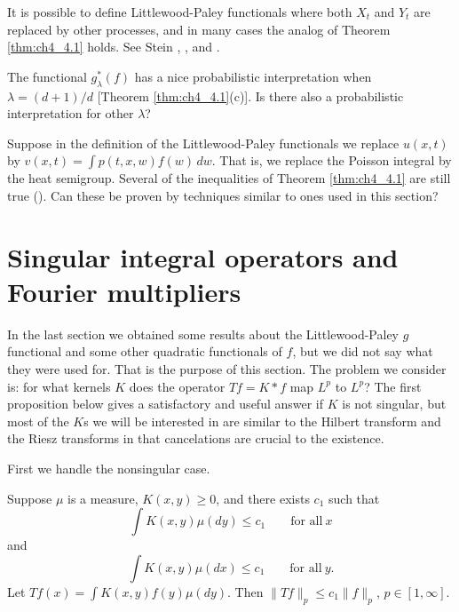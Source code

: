 
It is possible to define Littlewood-Paley functionals where both $X_t$ and $Y_t$ are replaced by other processes, and in many cases the analog of Theorem \ref{thm:ch4_4.1} holds. See Stein \cite{Stein1970b}, \cite{Meyer1976,Meyer1981}, and \cite{Marias1987}.

The functional $g_\lambda^*(f)$ has a nice probabilistic interpretation when $\lambda = (d+1)/d$ [Theorem \ref{thm:ch4_4.1}(c)]. Is there also a probabilistic interpretation for other $\lambda$?

Suppose in the definition of the Littlewood-Paley functionals we replace $u(x,t)$ by $v(x,t) = \int p(t,x,w)f(w)\,dw$. That is, we replace the Poisson integral by the heat semigroup. Several of the inequalities of Theorem \ref{thm:ch4_4.1} are still true (\cite[see][]{Stein1970b}). Can these be proven by techniques similar to ones used in this section?

\section{Singular integral operators and Fourier multipliers}\label{ch4_sec5}


In the last section we obtained some results about the Littlewood-Paley $g$ functional and some other quadratic functionals of $f$, but we did not say what they were used for. That is the purpose of this section. The problem we consider is: for what kernels $K$ does the operator $Tf = K * f$ map $L^p$ to $L^p$? The first proposition below gives a satisfactory and useful answer if $K$ is not singular, but most of the $K$s we will be interested in are similar to the Hilbert transform and the Riesz transforms in that cancelations are crucial to the existence.

First we handle the nonsingular case.

\begin{theorem}\label{thm:ch4_5.1}
Suppose $\mu$ is a measure, $K(x,y) \geq 0$, and there exists $c_1$ such that
\begin{equation}\label{eq:ch4_5.1}
    \int K(x,y)\mu(dy) \leq c_1 \qquad \text{for all}~x
\end{equation}
and
\begin{equation}\label{eq:ch4_5.2}
    \int K(x,y)\mu(dx) \leq c_1 \qquad \text{for all}~y.
\end{equation}
\mnewpage
Let $Tf(x) = \int K(x,y)f(y)\mu(dy)$. Then $\|Tf\|_p \leq c_1\|f\|_p$, $p \in [1,\infty]$.
\end{theorem}

